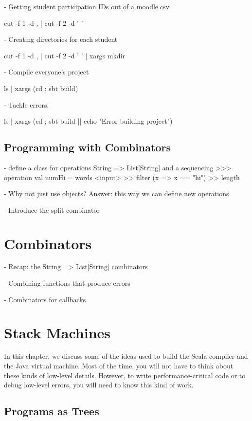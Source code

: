 \documentclass[9pt]{extbook}
\begin{document}
  - Getting student participation IDs out of a moodle.csv

    cut -f 1 -d , | cut -f 2 -d ' '

  - Creating directories for each student

    cut -f 1 -d , | cut -f 2 -d ' ' | xargs mkdir

  - Compile everyone's project

    ls | xargs (cd {}; sbt build)

  - Tackle errors:

    ls | xargs (cd {}; sbt build || echo "Error building project")

\section{Programming with Combinators}

- define a class for operations String => List[String] and a
  sequencing >>> operation
  val numHi = words <input> >> filter (x => x == "hi") >> length

- Why not just use objects? Answer: this way we can define new operations

- Introduce the split combinator

\chapter{Combinators}

- Recap: the String => List[String] combinators

- Combining functions that produce errors

- Combinators for callbacks

\chapter{Stack Machines}

In this chapter, we discuss some of the ideas used to build the Scala compiler and the Java virtual machine.
Most of the time, you will not have to think about these kinds of low-level details.
However, to write performance-critical code or to debug low-level
errors, you will need to know this kind of work.


\section{Programs as Trees}
\end{document}
